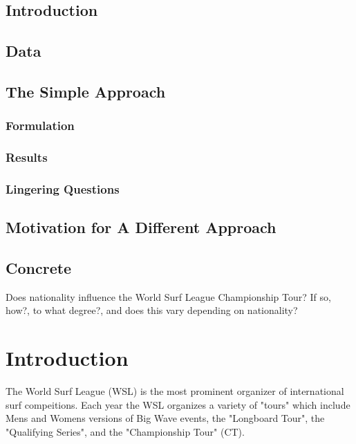 \documentclass[12pt,a4paper]{article}
\begin{document}
\subsection{Introduction}
\subsection{Data}
\subsection{The Simple Approach}
\subsubsection{Formulation}
\subsubsection{Results}
\subsubsection{Lingering Questions}

\subsection{Motivation for A Different Approach}

\subsection{Concrete}
Does nationality influence the World Surf League Championship Tour? If so, how?, to what degree?, and does this vary depending on nationality?


\section{Introduction}
The World Surf League (WSL) is the most prominent organizer of international surf compeitions. Each year the WSL organizes a variety of "tours" which include Mens and Womens versions of Big Wave events, the "Longboard Tour", the "Qualifying Series", and the "Championship Tour" (CT). 
\end{document}
